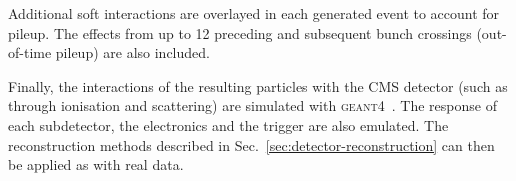 
Additional soft interactions are overlayed in each generated event to account 
for pileup. The effects from up to 12 preceding and subsequent bunch crossings 
(out-of-time pileup) are also included.

Finally, the interactions of the resulting particles with the CMS detector 
(such as through ionisation and scattering) are simulated with 
\textsc{geant4}~\cite{geant}. The response of each subdetector, the electronics 
and the trigger are also emulated. The reconstruction methods described in 
Sec.~\ref{sec:detector-reconstruction} can then be applied as with real data.

